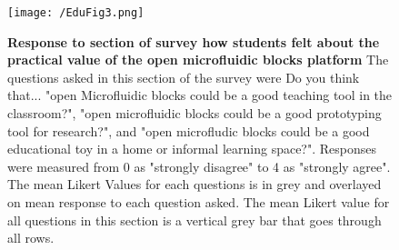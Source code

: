 \begin{figure}[h!] %
\centering
\texttt{[image: /EduFig3.png]}
\caption{\textbf{Response to section of survey how students felt about the practical value of the open microfluidic blocks platform} The questions asked in this section of the survey were Do you think that... "open Microfluidic blocks could be a good teaching tool in the classroom?", "open microfluidic blocks could be a good prototyping tool for research?", and "open microfludic blocks could be a good educational toy in a home or informal learning space?". Responses were measured from 0 as "strongly disagree" to 4 as "strongly agree". The mean Likert Values for each questions is in grey and overlayed on mean response to each question asked. The mean Likert value for all questions in this section is a vertical grey bar that goes through all rows.}
\label{figure:EduFig3}
\end{figure}

